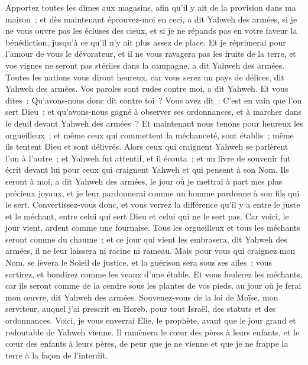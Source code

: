 \begin{multicols}{2}
Apportez toutes les dîmes aux magasins, afin qu'il y ait de la provision dans ma maison~; et dès maintenant éprouvez-moi en ceci, a dit Yahweh des armées, si je ne vous ouvre pas les écluses des cieux, et si je ne répands pas en votre faveur la bénédiction, jusqu'à ce qu'il n'y ait plus assez de place.
Et je réprimerai pour l'amour de vous le dévorateur, et il ne vous ravagera pas les fruits de la terre, et vos vignes ne seront pas stériles dans la campagne, a dit Yahweh des armées.
Toutes les nations vous diront heureux, car vous serez un pays de délices, dit Yahweh des armées.
Vos paroles sont rudes contre moi, a dit Yahweh. Et vous dites~: Qu'avons-nous donc dit contre toi~?
Vous avez dit~: C'est en vain que l'on sert Dieu~; et qu'avons-nous gagné à observer ses ordonnances, et à marcher dans le deuil devant Yahweh des armées~?
Et maintenant nous tenons pour heureux les orgueilleux~; et même ceux qui commettent la méchanceté, sont établis~; même ils tentent Dieu et sont délivrés.
Alors ceux qui craignent Yahweh se parlèrent l'un à l'autre~; et Yahweh fut attentif, et il écouta~; et un livre de souvenir fut écrit devant lui pour ceux qui craignent Yahweh et qui pensent à son Nom.
Ils seront à moi, a dit Yahweh des armées, le jour où je mettrai à part mes plus précieux joyaux, et je leur pardonnerai comme un homme pardonne à son fils qui le sert.
Convertissez-vous donc, et vous verrez la différence qu'il y a entre le juste et le méchant, entre celui qui sert Dieu et celui qui ne le sert pas.
\VerseOne{}Car voici, le jour vient, ardent comme une fournaise. Tous les orgueilleux et tous les méchants seront comme du chaume~; et ce jour qui vient les embrasera, dit Yahweh des armées, il ne leur laissera ni racine ni rameau.
Mais pour vous qui craignez mon Nom, se lèvera le Soleil de justice, et la guérison sera sous ses ailes~; vous sortirez, et bondirez comme les veaux d'une étable.
Et vous foulerez les méchants, car ils seront comme de la cendre sous les plantes de vos pieds, au jour où je ferai mon œuvre, dit Yahweh des armées.
Souvenez-vous de la loi de Moïse, mon serviteur, auquel j'ai prescrit en Horeb, pour tout Israël, des statuts et des ordonnances.
Voici, je vous enverrai Elie, le prophète, avant que le jour grand et redoutable de Yahweh vienne.
Il ramènera le cœur des pères à leurs enfants, et le cœur des enfants à leurs pères, de peur que je ne vienne et que je ne frappe la terre à la façon de l'interdit.
\PPE{}
\end{multicols}
